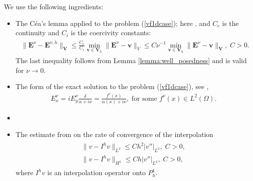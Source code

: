 We use the following ingredients:
\begin{itemize}
 \item The C\'ea's lemma applied to the problem (\ref{vf1dcase}); here , and $C_c$ is the continuity and $C_i$ is the coercivity constants:
\begin{align}
\label{eq:cea}
\begin{split}
 \|\mathbf{E}^{\nu}-\mathbf{E}^{\nu,h}\|_{\mathbf{V}}\leq \frac{C_c}{C_i}\min_{\mathbf{v}\in \mathbf{V}_h}\|\mathbf{E}^{\nu}-\mathbf{v}\|_{V}
 \leq C\nu^{-1}\min_{\mathbf{v}\in \mathbf{V}_h}\|\mathbf{E}^{\nu}-\mathbf{v}\|_{\mathbf{V}},\; C>0.
 \end{split}
\end{align}
The last inequality follows from Lemma \ref{lemma:well_posedness} and is valid for $\nu\rightarrow 0$.   
\item The form of the exact solution to the problem (\ref{vf1dcase}), see \cite{Despres_2014},
\begin{align}
\label{eq:exact}
 E_x^{\nu}=iE_{y}^{\nu}\frac{\delta}{\alpha+i\nu}=\frac{f^{\nu}(x)}{\alpha(x)+i\nu}, \; \text{for some }f^{\nu}(x)\in L^2(\Omega).
\end{align}
\item {}
\item The estimate from \cite[Chapter 0]{brenner} on the rate of convergence of the interpolation 
\begin{align}
\label{eq:interp}
\begin{split}
 \|v-I^{h}v\|_{L^2}\leq Ch^2\left|v''\right|_{L^2},\; C>0,\\
 \|v-I^{h}v\|_{H^1}\leq Ch|v''|_{L^2},\; C>0, 
 \end{split}
\end{align}
where $I^{h}v$ is an interpolation operator onto $P_{h}^{1}$. 
\end{itemize}
